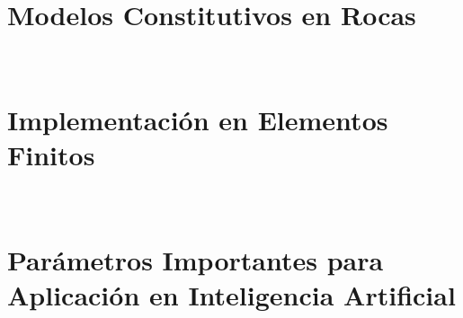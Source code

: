 \section{Modelos Constitutivos en Rocas}~\hypertarget{sec:sec540}{}
\label{sec:sec540}

\section{Implementación en Elementos Finitos}~\hypertarget{sec:sec550}{}
\label{sec:sec550}

\section{Parámetros Importantes para Aplicación en Inteligencia Artificial}~\hypertarget{sec:sec560}{}
\label{sec:sec560}



